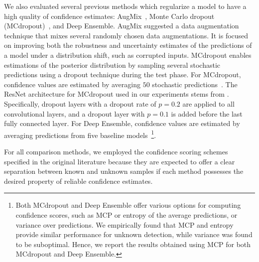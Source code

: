 \documentclass[preprint,12pt]{elsarticle}
\begin{document}
We also evaluated several previous methods which regularize a model to have a high quality of confidence estimates: AugMix~\citep{hendrycks2019augmix}, Monte Carlo dropout (MCdropout)~\citep{gal2016dropout}, and Deep Ensemble. AugMix suggested a data augmentation technique that mixes several randomly chosen data augmentations. It is focused on improving both the robustness and uncertainty estimates of the predictions of a model under a distribution shift, such as corrupted inputs. MCdropout enables estimations of the posterior distribution by sampling several stochastic predictions using a dropout technique during the test phase. For MCdropout, confidence values are estimated by averaging $50$ stochastic predictions~\citep{kendall2017aleatoric}. The ResNet architecture for MCdropout used in our experiments stems from \cite{zhang2019confidence}. Specifically, dropout layers with a dropout rate of $p=0.2$ are applied to all convolutional layers, and a dropout layer with $p=0.1$ is added before the last fully connected layer. For Deep Ensemble, confidence values are estimated by averaging predictions from five baseline models~\footnote{Both MCdropout and Deep Ensemble offer various options for computing confidence scores, such as MCP or entropy of the average predictions, or variance over predictions. We empirically found that MCP and entropy provide similar performance for unknown detection, while variance was found to be suboptimal. Hence, we report the results obtained using MCP for both MCdropout and Deep Ensemble.}.

For all comparison methods, we employed the confidence scoring schemes specified in the original literature because they are expected to offer a clear separation between known and unknown samples if each method possesses the desired property of reliable confidence estimates.
\end{document}
